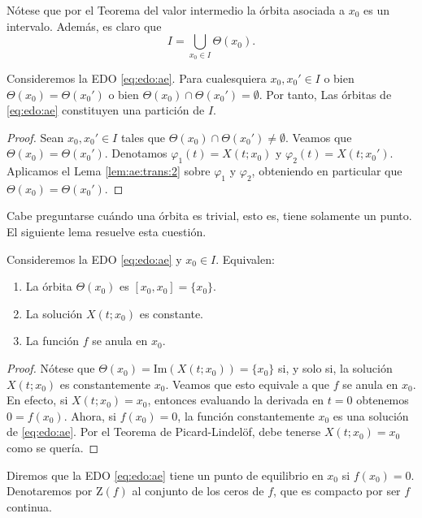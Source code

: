 \documentclass{article}
\begin{document}
Nótese que por el Teorema del valor intermedio la órbita asociada a $x_0$ es un intervalo. Además,
es claro que
\[I = \bigcup_{x_0 \in I} \Theta(x_0).\]

\begin{cor} \label{cor:ae:particion} Consideremos la EDO \eqref{eq:edo:ae}. Para cualesquiera
  $x_0, x_0' \in I$ o bien $\Theta(x_0) = \Theta(x_0')$ o bien
  $\Theta(x_0) \cap \Theta(x_0') = \emptyset$. Por tanto, Las órbitas de \eqref{eq:edo:ae}
  constituyen una partición de $I$.
\end{cor}
\begin{proof}
  Sean $x_0, x_0' \in I$ tales que $\Theta(x_0) \cap \Theta(x_0') \ne \emptyset$.  Veamos que
  $\Theta(x_0) = \Theta(x_0')$. Denotamos $\varphi_1(t) = X(t; x_0)$ y $\varphi_2(t) = X(t;
  x_0')$. Aplicamos el Lema \ref{lem:ae:trans:2} sobre $\varphi_1$ y $\varphi_2$, obteniendo en
  particular que $\Theta(x_0) = \Theta(x_0')$.
\end{proof}

Cabe preguntarse cuándo una órbita es trivial, esto es, tiene solamente un punto. El siguiente lema
resuelve esta cuestión.

\begin{lemma} \label{lem:ae:0} Consideremos la EDO \eqref{eq:edo:ae} y $x_0 \in I$. Equivalen:
  \begin{enumerate}
  \item La órbita $\Theta(x_0)$ es $[x_0, x_0] = \{x_0\}$.
  \item La solución $X(t; x_0)$ es constante.
  \item La función $f$ se anula en $x_0$.
  \end{enumerate}
\end{lemma}
\begin{proof}
  Nótese que $\Theta(x_0) = \mathrm{Im}(X(t;x_0)) = \{x_0\}$ si, y solo si, la solución $X(t;x_0)$
  es constantemente $x_0$. Veamos que esto equivale a que $f$ se anula en $x_0$. En efecto, si
  $X(t; x_0) = x_0$, entonces evaluando la derivada en $t = 0$ obtenemos $0 = f(x_0)$. Ahora, si
  $f(x_0) = 0$, la función constantemente $x_0$ es una solución de \eqref{eq:edo:ae}. Por el Teorema
  de Picard-Lindelöf, debe tenerse $X(t;x_0) = x_0$ como se quería.
\end{proof}

\begin{definition}
  Diremos que la EDO \eqref{eq:edo:ae} tiene un punto de equilibrio en $x_0$ si $f(x_0) = 0$.
  Denotaremos por $\mathrm{Z}(f)$ al conjunto de los ceros de $f$, que es compacto por ser $f$
  continua.
\end{definition}
\end{document}
